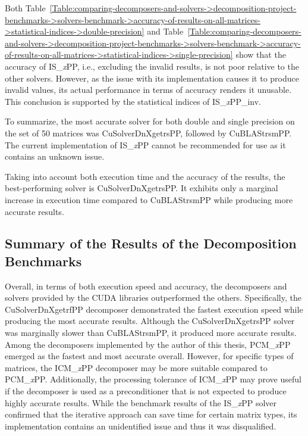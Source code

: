 Both Table~\ref{Table:comparing-decomposers-and-solvers->decomposition-project-benchmarks->solvers-benchmark->accuracy-of-results-on-all-matrices->statistical-indices->double-precision} and Table~\ref{Table:comparing-decomposers-and-solvers->decomposition-project-benchmarks->solvers-benchmark->accuracy-of-results-on-all-matrices->statistical-indices->single-precision} show that the accuracy of IS\_\textit{x}PP, i.e., excluding the invalid results, is not poor relative to the other solvers.
However, as the issue with its implementation causes it to produce invalid values, its actual performance in terms of accuracy renders it unusable.
This conclusion is supported by the statistical indices of IS\_\textit{x}PP\_inv.

To summarize, the most accurate solver for both double and single precision on the set of 50 matrices was CuSolverDnXgetrsPP, followed by CuBLAStrsmPP.
The current implementation of IS\_\textit{x}PP cannot be recommended for use as it contains an unknown issue.

Taking into account both execution time and the accuracy of the results, the best-performing solver is CuSolverDnXgetrsPP.
It exhibits only a marginal increase in execution time compared to CuBLAStrsmPP while producing more accurate results.

\subsection{Summary of the Results of the Decomposition Benchmarks}\label{Subsection:comparing-decomposers-and-solvers->decomposition-project-benchmarks->solvers-benchmark->summary-of-results-of-decomposition-benchmarks}
Overall, in terms of both execution speed and accuracy, the decomposers and solvers provided by the CUDA libraries outperformed the others.
Specifically, the CuSolverDnXgetrfPP decomposer demonstrated the fastest execution speed while producing the most accurate results.
Although the CuSolverDnXgetrsPP solver was marginally slower than CuBLAStrsmPP, it produced more accurate results.
Among the decomposers implemented by the author of this thesis, PCM\_\textit{x}PP emerged as the fastest and most accurate overall.
However, for specific types of matrices, the ICM\_\textit{x}PP decomposer may be more suitable compared to PCM\_\textit{x}PP.
Additionally, the processing tolerance of ICM\_\textit{x}PP may prove useful if the decomposer is used as a preconditioner that is not expected to produce highly accurate results.
While the benchmark results of the IS\_\textit{x}PP solver confirmed that the iterative approach can save time for certain matrix types, its implementation contains an unidentified issue and thus it was disqualified.




